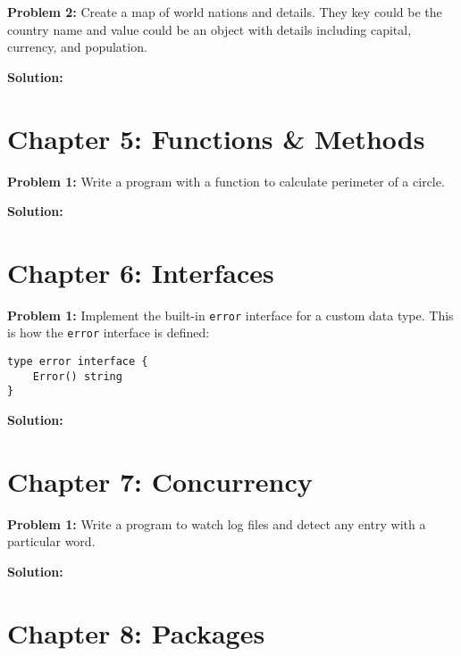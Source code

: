

\textbf{Problem 2:} Create a map of world nations and details. They key could
be the country name and value could be an object with details including capital,
currency, and population.

\textbf{Solution:}



\section*{Chapter 5: Functions \& Methods}

\textbf{Problem 1:} Write a program with a function to calculate perimeter of a circle.

\textbf{Solution:}



\section*{Chapter 6: Interfaces}

\textbf{Problem 1:} Implement the built-in \texttt{error} interface for a custom data type.  This is how the \texttt{error} interface is defined:

\begin{lstlisting}[numbers=none]
type error interface {
    Error() string
}
\end{lstlisting}

\textbf{Solution:}



\section*{Chapter 7: Concurrency}

{\bfseries Problem 1:} Write a program to watch log files and detect
any entry with a particular word.

\textbf{Solution:}



\section*{Chapter 8: Packages}

